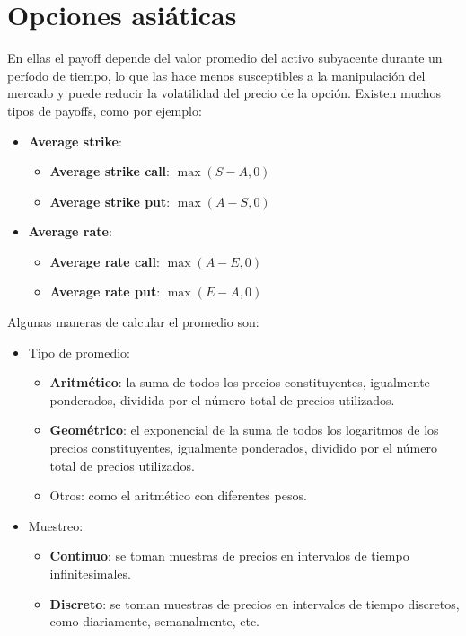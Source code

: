 \section{Opciones asiáticas}\label{sec:asian_options}
En ellas el payoff depende del valor promedio del activo subyacente durante un período de tiempo, lo que las hace menos susceptibles a la manipulación del mercado y puede reducir la volatilidad del precio de la opción. Existen muchos tipos de payoffs, como por ejemplo:
\begin{itemize}
    \item \textbf{Average strike}:
    \begin{itemize}
        \item \textbf{Average strike call}: $\max(S-A, 0)$
        \item \textbf{Average strike put}: $\max(A-S, 0)$
    \end{itemize}
    \item \textbf{Average rate}:
    \begin{itemize}
        \item \textbf{Average rate call}: $\max(A-E, 0)$
        \item \textbf{Average rate put}: $\max(E-A, 0)$
    \end{itemize}
\end{itemize}

Algunas maneras de calcular el promedio son:
\begin{itemize}
    \item Tipo de promedio:
    \begin{itemize}
        \item \textbf{Aritmético}: la suma de todos los precios constituyentes, igualmente ponderados, dividida por el número total de precios utilizados.
        \item \textbf{Geométrico}: el exponencial de la suma de todos los logaritmos de los precios constituyentes, igualmente ponderados, dividido por el número total de precios utilizados.
        \item Otros: como el aritmético con diferentes pesos.
    \end{itemize}
    \item Muestreo:
    \begin{itemize}
        \item \textbf{Continuo}: se toman muestras de precios en intervalos de tiempo infinitesimales.
        \item \textbf{Discreto}: se toman muestras de precios en intervalos de tiempo discretos, como diariamente, semanalmente, etc.
    \end{itemize}
\end{itemize}




